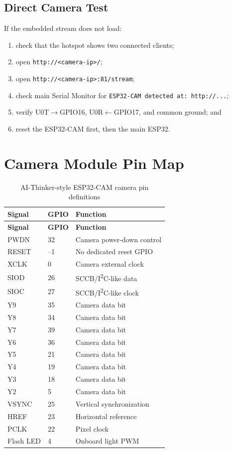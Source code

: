 \documentclass[12pt,a4paper,oneside]{report}
\newcommand{\code}[1]{\texttt{#1}}
\begin{document}
\section{Direct Camera Test}
If the embedded stream does not load:

\begin{enumerate}
  \item check that the hotspot shows two connected clients;
  \item open \code{http://<camera-ip>/};
  \item open \code{http://<camera-ip>:81/stream};
  \item check main Serial Monitor for
        \code{ESP32-CAM detected at: http://...};
  \item verify U0T$\rightarrow$GPIO16, U0R$\leftarrow$GPIO17, and common ground;
        and
  \item reset the ESP32-CAM first, then the main ESP32.
\end{enumerate}

\chapter{Camera Module Pin Map}
\begin{longtable}{p{5cm}p{3cm}p{7cm}}
  \caption{AI-Thinker-style ESP32-CAM camera pin definitions}\\
  \toprule
  \textbf{Signal} & \textbf{GPIO} & \textbf{Function} \\
  \midrule
  \endfirsthead
  \toprule
  \textbf{Signal} & \textbf{GPIO} & \textbf{Function} \\
  \midrule
  \endhead
  PWDN & 32 & Camera power-down control \\
  RESET & --1 & No dedicated reset GPIO \\
  XCLK & 0 & Camera external clock \\
  SIOD & 26 & SCCB/I\textsuperscript{2}C-like data \\
  SIOC & 27 & SCCB/I\textsuperscript{2}C-like clock \\
  Y9 & 35 & Camera data bit \\
  Y8 & 34 & Camera data bit \\
  Y7 & 39 & Camera data bit \\
  Y6 & 36 & Camera data bit \\
  Y5 & 21 & Camera data bit \\
  Y4 & 19 & Camera data bit \\
  Y3 & 18 & Camera data bit \\
  Y2 & 5 & Camera data bit \\
  VSYNC & 25 & Vertical synchronization \\
  HREF & 23 & Horizontal reference \\
  PCLK & 22 & Pixel clock \\
  Flash LED & 4 & Onboard light PWM \\
  \bottomrule
\end{longtable}
\end{document}
